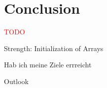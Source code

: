 \chapter{Conclusion}\label{chap:conclusion}

\textcolor{red}{TODO}

Strength: Initialization of Arrays

Hab ich meine Ziele errreicht

Outlook